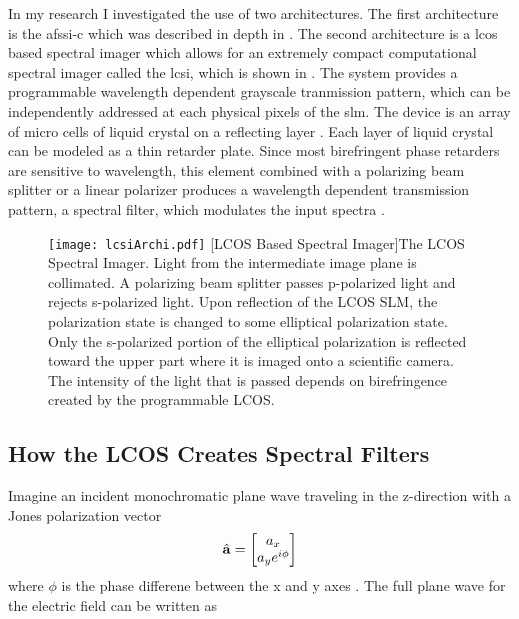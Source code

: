 In my research I investigated the use of two architectures. The first architecture is the \gls{afssi-c} which was described in depth in . The second architecture is a \acrfull{lcos} based spectral imager which allows for an extremely compact computational spectral imager called the \gls{lcsi}, which is shown in . The system provides a programmable wavelength dependent grayscale tranmission pattern, which can be independently addressed at each physical pixels of the \gls{slm}. The device is an array of micro cells of liquid crystal on a reflecting layer \cite{lazarev2012lcos}. Each layer of liquid crystal can be modeled as a thin retarder plate. Since most birefringent phase retarders are sensitive to wavelength, this element combined with a polarizing beam splitter or a linear polarizer produces a wavelength dependent transmission pattern, a spectral filter, which modulates the input spectra \cite{yuan2015compressive}.

\begin{figure}
	\texttt{[image: lcsiArchi.pdf]}
	[LCOS Based Spectral Imager]{The LCOS Spectral Imager. Light from the intermediate image plane is collimated. A polarizing beam splitter passes p-polarized light and rejects s-polarized light. Upon reflection of the LCOS SLM, the polarization state is changed to some elliptical polarization state. Only the s-polarized portion of the elliptical polarization is reflected toward the upper part where it is imaged onto a scientific camera. The intensity of the light that is passed depends on birefringence created by the programmable LCOS.}
	\label{fig:lcsiArchi}
\end{figure}

\subsection{How the LCOS Creates Spectral Filters}


Imagine an incident monochromatic plane wave traveling in the z-direction with a Jones polarization vector 
\begin{equation}
\hat{ \displaystyle \mathbf{a} } = 
	\begin{bmatrix}
    	a_{x}  \\
    	a_{y} e^{ i \phi  }  \\
   \end{bmatrix}
\end{equation}
%
where $\phi$ is the phase differene between the x and y axes \cite{milster2013notes}. The full plane wave for the electric field can be written as

